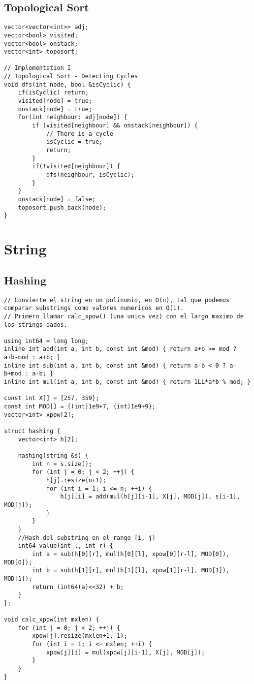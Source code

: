\documentclass[10pt,letterpaper,twocolumn,twosided]{article}
\begin{document}
\subsection{Topological Sort}
\begin{lstlisting}
vector<vector<int>> adj;
vector<bool> visited;
vector<bool> onstack;
vector<int> toposort;

// Implementation I
// Topological Sort - Detecting Cycles
void dfs(int node, bool &isCyclic) {
    if(isCyclic) return;
    visited[node] = true;
    onstack[node] = true;
    for(int neighbour: adj[node]) {
        if (visited[neighbour] && onstack[neighbour]) {
            // There is a cycle
            isCyclic = true;
            return;
        }
        if(!visited[neighbour]) {
            dfs(neighbour, isCyclic);
        }
    }
    onstack[node] = false;
    toposort.push_back(node);
}
\end{lstlisting}


\section{String}

\subsection{Hashing}
\begin{lstlisting}
// Convierte el string en un polinomio, en O(n), tal que podemos comparar substrings como valores numericos en O(1).
// Primero llamar calc_xpow() (una unica vez) con el largo maximo de los strings dados.

using int64 = long long;
inline int add(int a, int b, const int &mod) { return a+b >= mod ? a+b-mod : a+b; }
inline int sub(int a, int b, const int &mod) { return a-b < 0 ? a-b+mod : a-b; }
inline int mul(int a, int b, const int &mod) { return 1LL*a*b % mod; }

const int X[] = {257, 359};
const int MOD[] = {(int)1e9+7, (int)1e9+9};
vector<int> xpow[2];

struct hashing {
    vector<int> h[2];
    
    hashing(string &s) {
        int n = s.size();
        for (int j = 0; j < 2; ++j) {
            h[j].resize(n+1);
            for (int i = 1; i <= n; ++i) {
                h[j][i] = add(mul(h[j][i-1], X[j], MOD[j]), s[i-1], MOD[j]);
            }
        }
    }
    //Hash del substring en el rango [i, j)
    int64 value(int l, int r) {
        int a = sub(h[0][r], mul(h[0][l], xpow[0][r-l], MOD[0]), MOD[0]);
        int b = sub(h[1][r], mul(h[1][l], xpow[1][r-l], MOD[1]), MOD[1]);
        return (int64(a)<<32) + b;
    }
};

void calc_xpow(int mxlen) {
    for (int j = 0; j < 2; ++j) {
        xpow[j].resize(mxlen+1, 1);
        for (int i = 1; i <= mxlen; ++i) {
            xpow[j][i] = mul(xpow[j][i-1], X[j], MOD[j]);
        }
    }
}
\end{lstlisting}
\end{document}
